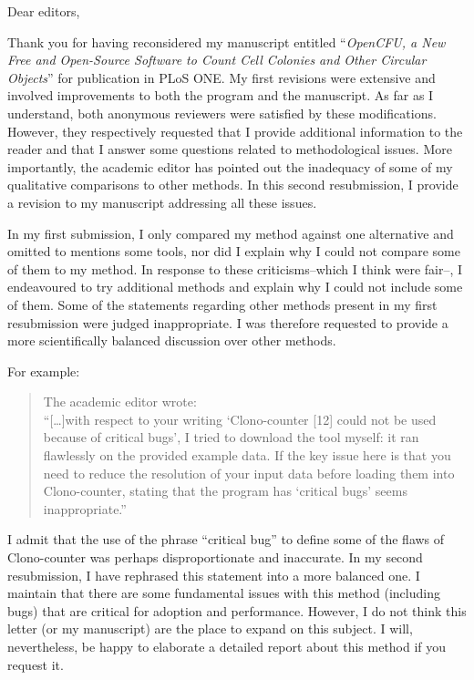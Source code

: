 \documentclass{letter}
\newcommand{\Otitle}{\emph{OpenCFU, a New Free and Open-Source Software to Count
Cell Colonies and Other Circular Objects}}
\begin{document}
\begin{letter}{}
\opening{Dear editors,}
Thank you for having reconsidered my manuscript entitled ``\Otitle{}'' for publication in PLoS ONE.
My first revisions were extensive and 
involved improvements to 
both the program and the manuscript.
As far as I understand, both anonymous reviewers were satisfied by these modifications.
However, they respectively requested that I provide additional information
to the reader and that I answer some questions
related to methodological issues. More importantly, the academic editor has pointed out the
inadequacy of some of my qualitative comparisons to other methods. 
In this second resubmission, I provide a revision to my manuscript addressing all these issues.

In my first submission, I only compared my method against one alternative and omitted to
mentions some tools, nor did I explain why I could not compare some of them to my method.
In response to 
these 
criticisms--which I think were fair--,
I endeavoured to try additional methods and explain why I could not include some of them.
Some of the statements regarding other methods present in my first resubmission were judged inappropriate.
I was therefore requested to provide a more scientifically balanced discussion over other methods.

For example:
\begin{quote}
The academic editor wrote:\\
``[\ldots]with respect to your writing `Clono-counter [12] could not be used because of critical bugs',
I tried to download the tool myself: it ran flawlessly on the provided example data.
If the key issue here is that you need to reduce the resolution of your
input data before loading them into Clono-counter,
stating that the program has `critical bugs' seems inappropriate.''\\
\end{quote}

I admit that the use of the 
phrase
``critical bug'' to define
some of the flaws of Clono-counter
was perhaps disproportionate and inaccurate. 
In my second resubmission, I have rephrased this statement into a more balanced one.
I maintain
that there are some fundamental issues with this method 
(including bugs) that are critical for adoption and performance. 
However, I do not think this letter (or my manuscript) are the place to expand on this subject. I will, nevertheless, be happy to elaborate a detailed report about this method if you request it.
 

\end{letter}
\end{document}
